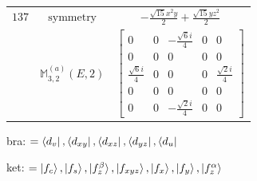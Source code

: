 \documentclass[fleqn,8pt,landscape]{jsarticle}
\begin{document}
\begin{longtable}{ccc}
$ 137 $ & $ \text{symmetry} $ & $ - \frac{\sqrt{15} x^{2} y}{2} + \frac{\sqrt{15} y z^{2}}{2} $ \\
$  $ & $ \mathbb{M}_{3,2}^{(a)}(E,2) $ & $ \begin{bmatrix} 0 & 0 & - \frac{\sqrt{6} i}{4} & 0 & 0 \\ 0 & 0 & 0 & 0 & 0 \\ \frac{\sqrt{6} i}{4} & 0 & 0 & 0 & \frac{\sqrt{2} i}{4} \\ 0 & 0 & 0 & 0 & 0 \\ 0 & 0 & - \frac{\sqrt{2} i}{4} & 0 & 0 \end{bmatrix} $ \\ \hline
\end{longtable}
bra: $=\bra{d_{v}}, \bra{d_{xy}}, \bra{d_{xz}}, \bra{d_{yz}}, \bra{d_{u}}$

\noindent
ket: $=\ket{f_{c}}, \ket{f_{s}}, \ket{f_{z}^{\beta}}, \ket{f_{xyz}}, \ket{f_{x}}, \ket{f_{y}}, \ket{f_{z}^{\alpha}}$
\renewcommand{\arraystretch}{1.6}
\end{document}
